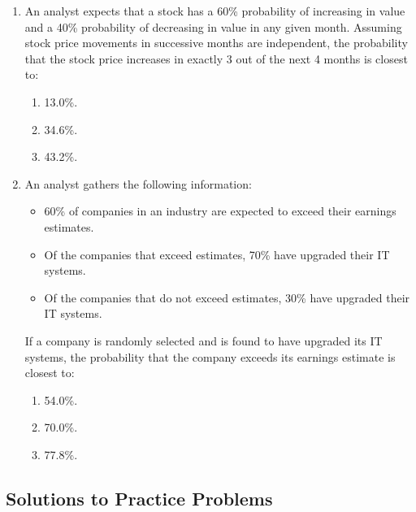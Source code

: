 \begin{enumerate}
	\item An analyst expects that a stock has a 60\% probability of increasing in value and a 40\% probability of decreasing in value in any given month. Assuming stock price movements in successive months are independent, the probability that the stock price increases in exactly 3 out of the next 4 months is closest to:
	      \begin{enumerate}[label=\Alph*.]
		      \item 13.0\%.
		      \item 34.6\%.
		      \item 43.2\%.
	      \end{enumerate}

	\item An analyst gathers the following information:
	      \begin{itemize}
		      \item 60\% of companies in an industry are expected to exceed their earnings estimates.
		      \item Of the companies that exceed estimates, 70\% have upgraded their IT systems.
		      \item Of the companies that do not exceed estimates, 30\% have upgraded their IT systems.
	      \end{itemize}
	      If a company is randomly selected and is found to have upgraded its IT systems, the probability that the company exceeds its earnings estimate is closest to:
	      \begin{enumerate}[label=\Alph*.]
		      \item 54.0\%.
		      \item 70.0\%.
		      \item 77.8\%.
	      \end{enumerate}
\end{enumerate}

\subsection{Solutions to Practice Problems}
\label{subsec:app_Solutions_M6}

